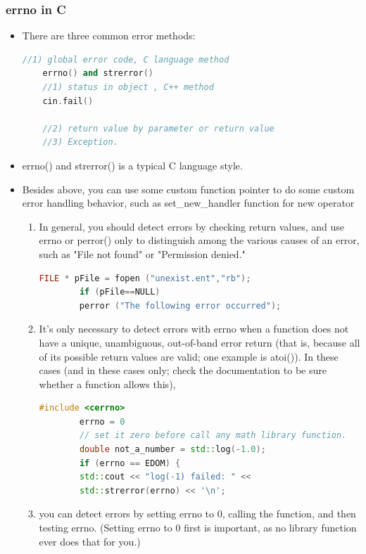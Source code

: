 \documentclass[a4paper,12pt,twoside]{book}
\begin{document}
\subsubsection{errno in C}
\begin{itemize}
	
	\item There are three common error methods:
	\begin{lstlisting}[frame=single, language=c++]
	//1) global error code, C language method
	errno() and strerror()
	//1) status in object , C++ method
	cin.fail()
	
	//2) return value by parameter or return value
	//3) Exception.
	\end{lstlisting}
	
	\item errno() and strerror() is a typical C language style.
	
	
	\item Besides above, you can use some custom function pointer to do some custom error handling behavior, such as set\_new\_handler function for new operator
	
	\begin{enumerate}
		\item In general, you should detect errors by checking return values, and use errno or perror() only to distinguish among the various causes of an error, such as "File not found" or "Permission denied."
		
		\begin{lstlisting}[frame=single, language=c++]
		FILE * pFile = fopen ("unexist.ent","rb");
		if (pFile==NULL)
		perror ("The following error occurred");
		\end{lstlisting}
		
		\item It's only necessary to detect errors with errno when a function does not have a unique, unambiguous, out-of-band error return (that is, because all of its possible return values are valid; one example is atoi()). In these cases (and in these cases only; check the documentation to be sure whether a function allows this),
		\begin{lstlisting}[frame=single, language=c++]
		#include <cerrno>
		errno = 0
		// set it zero before call any math library function.
		double not_a_number = std::log(-1.0);
		if (errno == EDOM) {
		std::cout << "log(-1) failed: " <<
		std::strerror(errno) << '\n';
		\end{lstlisting}
		\item you can detect errors by setting errno to 0, calling the function, and then testing errno. (Setting errno to 0 first is important, as no library function ever does that for you.)
	\end{enumerate}
	

\end{itemize}
\end{document}
